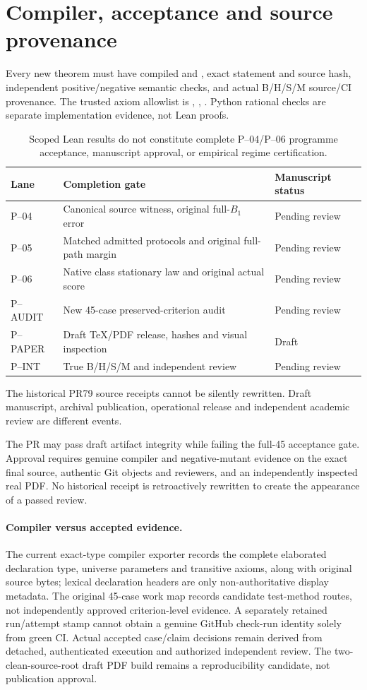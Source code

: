 \section{Compiler, acceptance and source provenance}
Every new theorem must have compiled  and
, exact statement and source hash, independent
positive/negative semantic checks, and actual B/H/S/M source/CI
provenance. The trusted axiom allowlist is ,
, . Python rational checks
are separate implementation evidence, not Lean proofs.
\begin{table}[htbp]\centering\small
\begin{tabularx}{\linewidth}{@{}lXl@{}}\toprule
Lane&Completion gate&Manuscript status\\\midrule
P--04&Canonical source witness, original full-$B_1$ error&Pending review\\
P--05&Matched admitted protocols and original full-path margin&Pending review\\
P--06&Native class stationary law and original actual score&Pending review\\
P--AUDIT&New 45-case preserved-criterion audit&Pending review\\
P--PAPER&Draft TeX/PDF release, hashes and visual inspection&Draft\\
P--INT&True B/H/S/M and independent review&Pending review\\\bottomrule
\end{tabularx}
\caption{Scoped Lean results do not constitute complete P--04/P--06
programme acceptance, manuscript approval, or empirical regime certification.}
\end{table}
The historical PR79 source receipts cannot be silently rewritten.
Draft manuscript, archival publication, operational release and
independent academic review are different events.


The PR may pass draft artifact integrity while failing the full-45
acceptance gate. Approval requires genuine compiler and negative-mutant
evidence on the exact final source, authentic Git objects and reviewers,
and an independently inspected real PDF. No historical receipt is
retroactively rewritten to create the appearance of a passed review.


\paragraph{Compiler versus accepted evidence.}
The current exact-type compiler exporter records the complete
elaborated declaration type, universe parameters and transitive axioms,
along with original source bytes; lexical declaration headers are only
non-authoritative display metadata. The original 45-case work map
records candidate test-method routes, not independently approved
criterion-level evidence. A separately retained run/attempt stamp
cannot obtain a genuine GitHub check-run identity solely from green CI.
Actual accepted case/claim decisions remain derived from detached,
authenticated execution and authorized independent review. The
two-clean-source-root draft PDF build remains a reproducibility
candidate, not publication approval.


